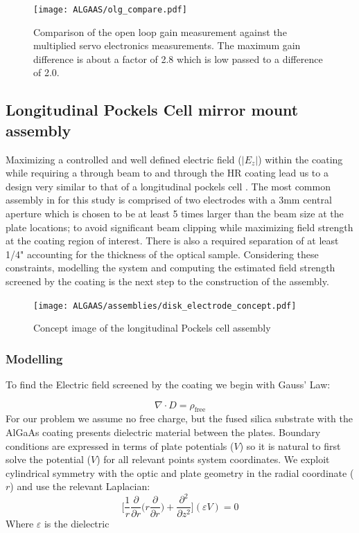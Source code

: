 \begin{figure}[H]
\begin{center}
\texttt{[image: ALGAAS/olg\_compare.pdf]}
\end{center}
\caption{Comparison of the open loop gain measurement against the multiplied servo electronics measurements. The maximum gain difference is about a factor of 2.8 which is low passed to a difference of 2.0.}
\label{fig:OLG_compare}
\end{figure}


\subsection{Longitudinal Pockels Cell mirror mount assembly}
Maximizing a controlled and well defined electric field ($|E_z|$) within the coating while requiring a through beam to and through the HR coating lead us to a design very similar to that of a longitudinal pockels cell \cite{}. The most common assembly in for this study is comprised of two electrodes with a 3mm central aperture which is chosen to be at least 5 times larger than the beam size at the plate locations; to avoid significant beam clipping while maximizing field strength at the coating region of interest. There is also a required separation of at least 1/4" accounting for the thickness of the optical sample. Considering these constraints, modelling the system and computing the estimated field strength screened by the coating is the next step to the construction of the assembly.

\begin{figure}[H]
\begin{center}
\texttt{[image: ALGAAS/assemblies/disk\_electrode\_concept.pdf]}
\end{center}
\caption{Concept image of the longitudinal Pockels cell assembly}
\label{fig:pock_cell_assembly_concept}
\end{figure}

\subsubsection{Modelling}

To find the Electric field screened by the coating we begin with Gauss' Law:

\begin{equation}
\nabla \cdot D = \rho_\mathrm{free}
\end{equation}
For our problem we assume no free charge, but the fused silica substrate with the AlGaAs coating presents dielectric material between the plates. Boundary conditions are expressed in terms of plate potentials ($V$) so it is natural to first solve the potential ($V$) for all relevant points system coordinates. We exploit cylindrical symmetry with the optic and plate geometry in the radial coordinate ($r$) and use the relevant Laplacian: 
\begin{equation}
\bigg[\frac{1}{r}\frac{\partial}{\partial r} \bigg( r \frac{\partial}{\partial r}\bigg) + \frac{\partial^2}{\partial z^2}\bigg](\varepsilon V) = 0
\end{equation}
Where $\varepsilon$ is the dielectric

